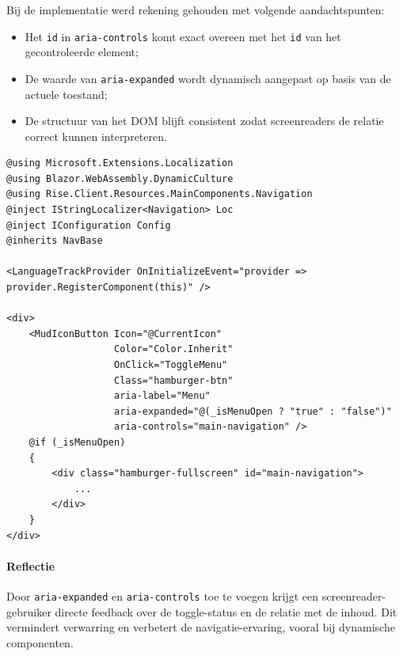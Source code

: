Bij de implementatie werd rekening gehouden met volgende aandachtspunten:

\begin{itemize}
	\item Het \texttt{id} in \texttt{aria-controls} komt exact overeen met het \texttt{id} van het gecontroleerde element;
	\item De waarde van \texttt{aria-expanded} wordt dynamisch aangepast op basis van de actuele toestand;
	\item De structuur van het DOM blijft consistent zodat screenreaders de relatie correct kunnen interpreteren.
\end{itemize}

\begin{listing}[H]
\begin{verbatim}
@using Microsoft.Extensions.Localization
@using Blazor.WebAssembly.DynamicCulture
@using Rise.Client.Resources.MainComponents.Navigation
@inject IStringLocalizer<Navigation> Loc
@inject IConfiguration Config
@inherits NavBase

<LanguageTrackProvider OnInitializeEvent="provider => provider.RegisterComponent(this)" />

<div>
    <MudIconButton Icon="@CurrentIcon"
                   Color="Color.Inherit"
                   OnClick="ToggleMenu"
                   Class="hamburger-btn" 
                   aria-label="Menu"
                   aria-expanded="@(_isMenuOpen ? "true" : "false")"
                   aria-controls="main-navigation" />
    @if (_isMenuOpen)
    {
        <div class="hamburger-fullscreen" id="main-navigation">
            ...
        </div>
    }
</div>
\end{verbatim}
\caption{Gebruik van \texttt{aria-expanded} en \texttt{aria-controls} bij een hamburgermenu.}
\label{lst:aria-expanded-controls}
\end{listing}

\paragraph{Reflectie}

Door \texttt{aria-expanded} en \texttt{aria-controls} toe te voegen krijgt een screenreader-gebruiker directe feedback over de toggle-status en de relatie met de inhoud. Dit vermindert verwarring en verbetert de navigatie-ervaring, vooral bij dynamische componenten.


